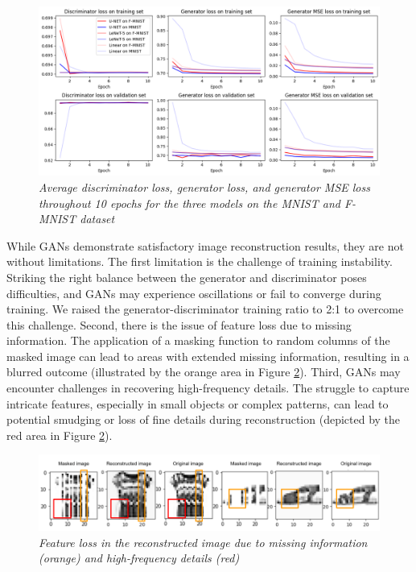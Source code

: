 \begin{figure}[H]
    \centering
    \includegraphics[width=\textwidth]{Figure/Front_page/losses.png}
    \caption{\textit{Average discriminator loss, generator loss, and generator MSE loss throughout 10 epochs for the three models on the MNIST and F-MNIST dataset}}
    \label{fig:loss}
\end{figure}

\noindent While GANs demonstrate satisfactory image reconstruction results, they are not without limitations. The first limitation is the challenge of training instability. Striking the right balance between the generator and discriminator poses difficulties, and GANs may experience oscillations or fail to converge during training. \cite{saxena2021generative} We raised the generator-discriminator training ratio to 2:1 to overcome this challenge. Second, there is the issue of feature loss due to missing information. The application of a masking function to random columns of the masked image can lead to areas with extended missing information, resulting in a blurred outcome (illustrated by the orange area in Figure \ref{fig:feature loss}). Third, GANs may encounter challenges in recovering high-frequency details. The struggle to capture intricate features, especially in small objects or complex patterns, can lead to potential smudging or loss of fine details during reconstruction (depicted by the red area in Figure \ref{fig:feature loss}).

\begin{figure}[H]
    \centering
    \includegraphics[width=\textwidth]{Figure/Front_page/feature lost.png}
    \caption{\textit{Feature loss in the reconstructed image due to missing information (orange) and high-frequency details (red)}}
    \label{fig:feature loss}
\end{figure}


